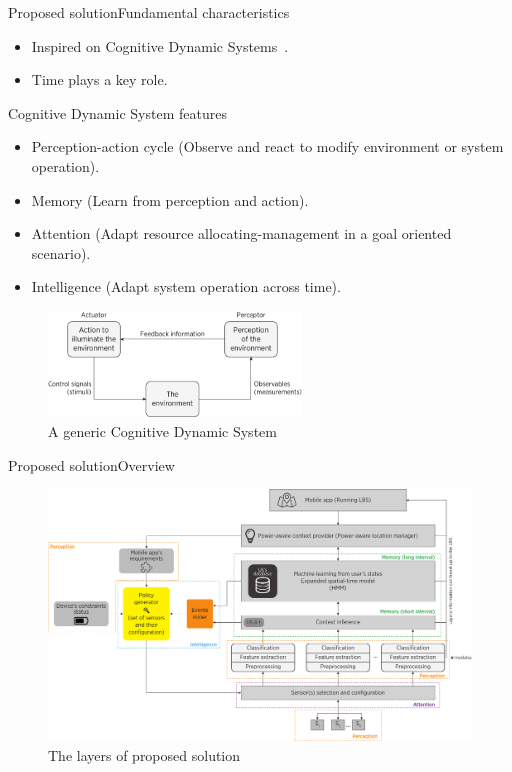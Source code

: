 \documentclass[8pt,xcolor={dvipsnames},handout]{beamer}
\begin{document}
\begin{frame}{Proposed solution}{Fundamental characteristics}
\begin{itemize}
  \item Inspired on Cognitive Dynamic Systems~\cite{Haykin2006}.
  \item Time plays a key role.
\end{itemize}

\begin{exampleblock}{Cognitive Dynamic System features}
\begin{itemize}
    \item Perception-action cycle (Observe and react to modify environment or system operation).
    \pause
    \item Memory (Learn from perception and action).
    \pause
    \item Attention (Adapt resource allocating-management in a goal oriented scenario).
    \pause
    \item Intelligence (Adapt system operation across time).
  \end{itemize}
\end{exampleblock}

\begin{figure}
  \centering
  \includegraphics[width=0.6\textwidth]{vectors/cds-generic}
  \caption{A generic Cognitive Dynamic System}
  \label{fig:cds-generic}
\end{figure}
\end{frame}

\begin{frame}{Proposed solution}{Overview}
\begin{figure}
  \centering
  \includegraphics[width=\textwidth]{vectors/solution-general-overview}
  \caption{The layers of proposed solution}
  \label{fig:solution}
\end{figure}
\end{frame}
\end{document}
